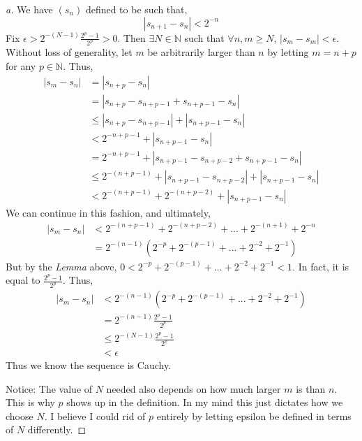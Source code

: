 \documentclass[leqno]{article}
\theoremstyle{nonumberplain}
\newtheorem{proof}{Proof}
\begin{document}
\begin{proof}[a]
We have $(s_n)$ defined to be such that,
\[
|s_{n+1}-s_n|<2^{-n}
\] 
Fix $\epsilon > 2^{-(N-1)}\frac{2^p-1}{2^p} > 0$.  Then $\exists N \in \mathbb{N}$ such that $\forall n, m \geq N$, $|s_m -s_m|<\epsilon$.  Without loss of generality, let $m$ be arbitrarily larger than $n$ by letting $m=n+p$ for any $p \in \mathbb{N}$. Thus,
\begin{align*}
|s_m - s_n| &= |s_{n+p} - s_n|\\
&= |s_{n+p}-s_{n+p-1}+s_{n+p-1}-s_{n}|\\
&\leq |s_{n+p}-s_{n+p-1}|+|s_{n+p-1}-s_{n}|\\
&< 2^{-n+p-1} + |s_{n+p-1}-s_{n}|\\
&= 2^{-n+p-1} + |s_{n+p-1}-s_{n+p-2}+s_{n+p-1}-s_{n}|\\
&\leq 2^{-(n+p-1)} + |s_{n+p-1}-s_{n+p-2}|+|s_{n+p-1}-s_{n}|\\
&< 2^{-(n+p-1)}+2^{-(n+p-2)}+|s_{n+p-1}-s_{n}|
\end{align*}
We can continue in this fashion, and ultimately,
\begin{align*}
|s_m-s_n| &< 2^{-(n+p-1)}+2^{-(n+p-2)} + ... + 2^{-(n+1)}+2^{-n}\\
&= 2^{-(n-1)} \left( 2^{-p} + 2^{-(p-1)}+... + 2^{-2} + 2^{-1} \right)
\end{align*}
But by the \emph{Lemma} above, $ 0< 2^{-p} + 2^{-(p-1)}+... + 2^{-2} + 2^{-1} < 1$.  In fact, it is equal to $\frac{2^p-1}{2^p}$.  Thus,
\begin{align*}
|s_m-s_n| &< 2^{-(n-1)} \left( 2^{-p} + 2^{-(p-1)}+... + 2^{-2} + 2^{-1} \right)\\
&= 2^{-(n-1)}\frac{2^p-1}{2^p}\\
&\leq 2^{-(N-1)}\frac{2^p-1}{2^p}\\
&<\epsilon
\end{align*}
Thus we know the sequence is Cauchy.

Notice: The value of $N$ needed also depends on how much larger $m$ is than $n$.  This is why $p$ shows up in the definition.  In my mind this just dictates how we choose $N$.  I believe I could rid of $p$ entirely by letting epsilon be defined in terms of $N$ differently.  

\end{proof}
\end{document}
